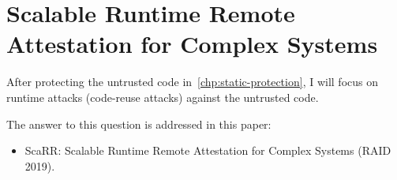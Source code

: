 \chapter{Scalable Runtime Remote Attestation for Complex Systems} %
\label{chp:runtime-protection-untrusted} 

After protecting the untrusted code in~\ref{chp:static-protection}, I will 
focus on runtime attacks (code-reuse attacks) against the untrusted code.

The answer to this question is addressed in this paper:
\begin{itemize}
	\item ScaRR: Scalable Runtime Remote Attestation for Complex Systems (RAID 
	2019).
\end{itemize}